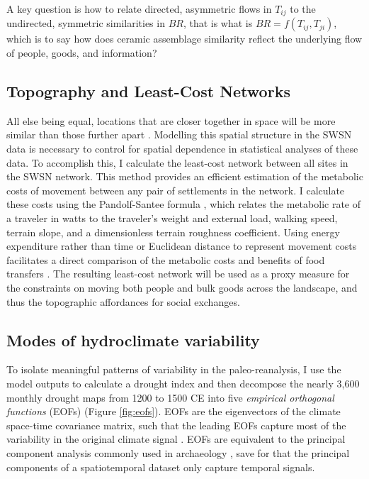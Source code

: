 \documentclass[fleqn,10pt]{wlscirep}
\begin{document}
A key question is how to relate directed, asymmetric flows in $T_{ij}$ to the undirected, symmetric similarities in $BR$, that is what is $BR = f(T_{ij},T_{ji})$, which is to say how does ceramic assemblage similarity reflect the underlying flow of people, goods, and information?

\subsection*{Topography and Least-Cost Networks}
All else being equal, locations that are closer together in space will be more similar than those further apart \cite{Tobler1970}. Modelling this spatial structure in the SWSN data is necessary to control for spatial dependence in statistical analyses of these data. To accomplish this, I calculate the least-cost network between all sites in the SWSN network. This method provides an efficient estimation of the metabolic costs of movement between any pair of settlements in the network. I calculate these costs using the Pandolf-Santee formula \cite{White2012}, which relates the metabolic rate of a traveler in watts to the traveler's weight and external load, walking speed, terrain slope, and a dimensionless terrain roughness coefficient. Using energy expenditure rather than time or Euclidean distance to represent movement costs facilitates a direct comparison of the metabolic costs and benefits of food transfers  \cite{Drennan1984}. The resulting least-cost network will be used as a proxy measure for the constraints on moving both people and bulk goods across the landscape, and thus the topographic affordances for social exchanges.

\subsection*{Modes of hydroclimate variability}
To isolate meaningful patterns of variability in the paleo-reanalysis, I use the model outputs to calculate a drought index and then decompose the nearly 3,600 monthly drought maps from 1200 to 1500 CE into five \textit{empirical orthogonal functions} (EOFs) (Figure \ref{fig:eofs}). EOFs are the eigenvectors of the climate space-time covariance matrix, such that the leading EOFs capture most of the variability in the original climate signal \cite{Lorenz1956EmpiricalPrediction}. EOFs are equivalent to the principal component analysis commonly used in archaeology \cite[e.g.]{Dean1996DemographyStress}, save for that the principal components of a spatiotemporal dataset only capture temporal signals.
\end{document}
